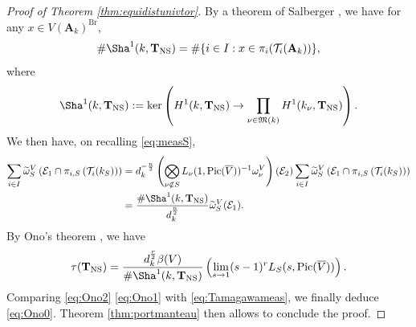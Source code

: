 \documentclass[11pt,letterpaper]{amsart}
\newcommand{\CE}{{\mathcal {E}}}
\newcommand{\RA}{{\mathbf {A}}}
\newcommand{\Pic}{\operatorname{Pic}}
\newcommand{\CTUT}{\mathcal{T}}
\newcommand{\CTNS}{\mathbf{T}_{\operatorname{NS}}}
\theoremstyle{plain}
\numberwithin{equation}{section}
\theoremstyle{definition}
\theoremstyle{remark}
\begin{document}
\begin{proof}[Proof of Theorem \ref{thm:equidistunivtor}]
 By a theorem of Salberger \cite[Lemma 6.17]{Salberger}, we have for any $x\in V(\RA_k)^{\operatorname{Br}}$, 
	$$\#\Sha^1(k,\CTNS)=\#\{i\in I:x\in \pi_i(\CTUT_i(\RA_k))\},$$ 	 where
	$$\Sha^1(k,\CTNS):=\ker\left(H^1(k,\CTNS)\to \prod_{\nu\in\mathfrak{M}(k)}H^1(k_\nu,\CTNS)\right).$$ We then have, on recalling \eqref{eq:measS},
	\begin{equation}\label{eq:Ono2}
		\begin{split}
				\sum_{i\in I}\widetilde{\omega}_S^V\left(\CE_1\cap\pi_{i,S}\left(\CTUT_i(k_S)\right)\right)&=d_k^{-\frac{n}{2}}\left(\bigotimes_{\nu\notin S}L_\nu(1,\Pic(\overline{V}))^{-1}\omega_\nu^V\right)(\CE_2)\sum_{i\in I}\widetilde{\omega}_S^V\left(\CE_1\cap\pi_{i,S}\left(\CTUT_i(k_S)\right)\right)\\&=\frac{\#\Sha^1(k,\CTNS)}{d_k^{\frac{n}{2}}}\widetilde{\omega}_S^V(\CE_1).
		\end{split}
	\end{equation}
	By Ono's theorem \cite[Main Theorem]{Ono}, we have
\begin{equation}\label{eq:Ono1}
	\tau(\CTNS)=\frac{d_k^{\frac{r}{2}}\beta(V)}{\# \Sha^1(k,\CTNS)}\left(\lim_{s\to 1}(s-1)^rL_S(s,\Pic(\overline{V}))\right).
\end{equation}
	Comparing \eqref{eq:Ono2} \eqref{eq:Ono1} with \eqref{eq:Tamagawameas}, we finally deduce \eqref{eq:Ono0}.
Theorem  \ref{thm:portmanteau} then allows to conclude the proof.
\end{proof}
\end{document}

